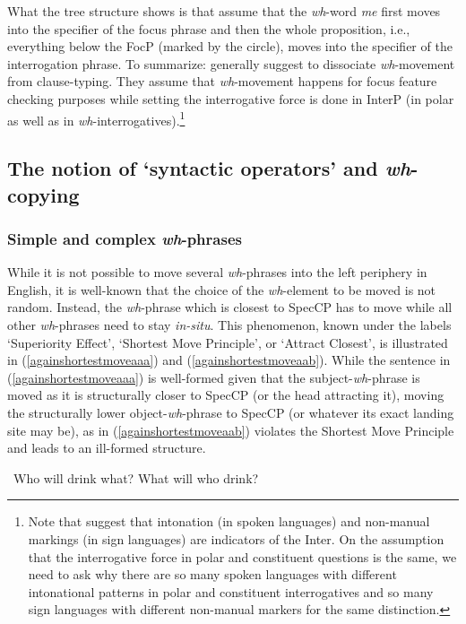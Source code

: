 \noindent What the tree structure shows is that \citet{aboh2010sa} assume that the \textit{wh}-word \textit{me} first moves into the specifier of the focus phrase and then the whole proposition, i.e., everything below the FocP (marked by the circle), moves into the specifier of the interrogation phrase. To summarize: \citet{aboh2010sa} generally suggest to dissociate \textit{wh}-movement from clause-typing. They assume that \textit{wh}-movement happens for focus feature checking purposes while setting the interrogative force is done in InterP (in polar as well as in \textit{wh}-interrogatives).\footnote{Note that \citet{aboh2010sa} suggest that intonation (in spoken languages) and non-manual markings (in sign languages) are indicators of the Inter\textdegree . On the assumption that the interrogative force in polar and constituent questions is the same, we need to ask why there are so many spoken languages with different intonational patterns in polar and constituent interrogatives and so many sign languages with different non-manual markers for the same distinction.} 

\subsection{The notion of `syntactic operators' and \textit{wh}-copying}\label{syntaxoperators}
\subsubsection{Simple and complex \textit{wh}-phrases}
While it is not possible to move several \textit{wh}-phrases into the left periphery in English, it is well-known that the choice of the \textit{wh}-element to be moved is not random. Instead, the \textit{wh}-phrase which is closest to SpecCP has to move while all other \textit{wh}-phrases need to stay \textit{in-situ}. This phenomenon, known under the labels `Superiority Effect', `Shortest Move Principle', or `Attract Closest', is illustrated in (\ref{againshortestmoveaaa}) and (\ref{againshortestmoveaab}). While the sentence in (\ref{againshortestmoveaaa}) is well-formed given that the subject-\textit{wh}-phrase is moved as it is structurally closer to SpecCP (or the head attracting it), moving the structurally lower object-\textit{wh}-phrase to SpecCP (or whatever its exact landing site may be), as in (\ref{againshortestmoveaab}) violates the Shortest Move Principle and leads to an ill-formed structure.

\begin{exe}
\ex\label{againshortestmove}\begin{xlist}
\ex \textcolor{white}{*}Who will drink what? \label{againshortestmoveaaa}
\ex *What will who drink? \label{againshortestmoveaab}
\end{xlist}
\end{exe}

